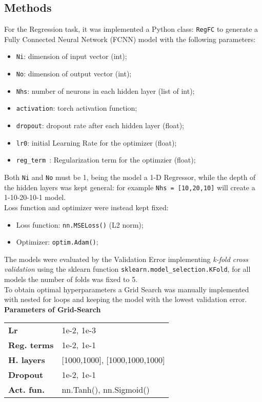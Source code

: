 \documentclass[11pt,a4paper,twocolumn]{IEEEtran}
\newcommand{\thinsepline}{\noindent\makebox[\linewidth]{\rule{7.5cm}{0.02pt}}}
\begin{document}
			\subsection{\textbf{Methods}}
			For the Regression task, it was implemented a Python class: \texttt{RegFC} to generate a Fully Connected Neural Network (FCNN) model with the following parameters:
			\begin{itemize}
				\item \texttt{Ni}: dimension of input vector (int);
				\item \texttt{No}: dimension of output vector (int);
				\item \texttt{Nhs}: number of neurons in each hidden layer (list of int);
				\item \texttt{activation}: torch activation function;
				\item \texttt{dropout}: dropout rate after each hidden layer (float);
				\item \texttt{lr0}: initial Learning Rate for the optimizer (float);
				\item \texttt{reg\_term }: Regularization term for the optimzier (float);
			\end{itemize}
			Both \texttt{Ni} and \texttt{No} must be 1, being the model a 1-D Regressor, while the depth of the hidden layers was kept general: for example \texttt{Nhs = [10,20,10]} will create a 1-10-20-10-1 model.\medskip\\
			Loss function and optimizer were instead kept fixed:
			\begin{itemize}
				\item Loss function: \texttt{nn.MSELoss()} (L2 norm);
				\item Optimizer: \texttt{optim.Adam()};
			\end{itemize}
			The models were evaluated by the Validation Error implementing \textit{k-fold cross validation} using the sklearn function \texttt{sklearn.model\_selection.KFold}, for all models the number of folds was fixed to 5.\\
			To obtain optimal hyperparameters a Grid Search was manually implemented with nested for loops and keeping the model with the lowest validation error.
			\thinsepline\\
			\textbf{Parameters of Grid-Search}\medskip\\
			\begin{tabular}{ll}
			\textbf{Lr}	& 1e-2, 1e-3 \\
			\textbf{Reg. terms}	& 1e-2, 1e-1 \\
			\textbf{H. layers} & [1000,1000], [1000,1000,1000] \\
			\textbf{Dropout} & 1e-2, 1e-1 \\
			\textbf{Act. fun.} & nn.Tanh(), nn.Sigmoid()
			\end{tabular}
			\thinsepline
\end{document}
